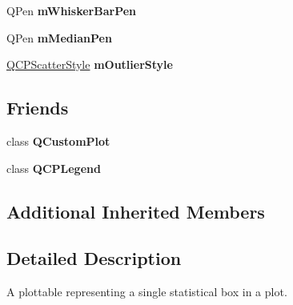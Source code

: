 \begin{DoxyCompactItemize}
\item 
Q\+Pen {\bfseries m\+Whisker\+Bar\+Pen}\hypertarget{class_q_c_p_statistical_box_aa719b1d722a9f82364df1497a6dc1da8}{}\label{class_q_c_p_statistical_box_aa719b1d722a9f82364df1497a6dc1da8}

\item 
Q\+Pen {\bfseries m\+Median\+Pen}\hypertarget{class_q_c_p_statistical_box_a1af5b601049c575f778ae270f40c9443}{}\label{class_q_c_p_statistical_box_a1af5b601049c575f778ae270f40c9443}

\item 
\hyperlink{class_q_c_p_scatter_style}{Q\+C\+P\+Scatter\+Style} {\bfseries m\+Outlier\+Style}\hypertarget{class_q_c_p_statistical_box_ae102e4187e1e6ba1f2df0f622b5171a4}{}\label{class_q_c_p_statistical_box_ae102e4187e1e6ba1f2df0f622b5171a4}

\end{DoxyCompactItemize}
\subsection*{Friends}
\begin{DoxyCompactItemize}
\item 
class {\bfseries Q\+Custom\+Plot}\hypertarget{class_q_c_p_statistical_box_a1cdf9df76adcfae45261690aa0ca2198}{}\label{class_q_c_p_statistical_box_a1cdf9df76adcfae45261690aa0ca2198}

\item 
class {\bfseries Q\+C\+P\+Legend}\hypertarget{class_q_c_p_statistical_box_a8429035e7adfbd7f05805a6530ad5e3b}{}\label{class_q_c_p_statistical_box_a8429035e7adfbd7f05805a6530ad5e3b}

\end{DoxyCompactItemize}
\subsection*{Additional Inherited Members}


\subsection{Detailed Description}
A plottable representing a single statistical box in a plot. 



